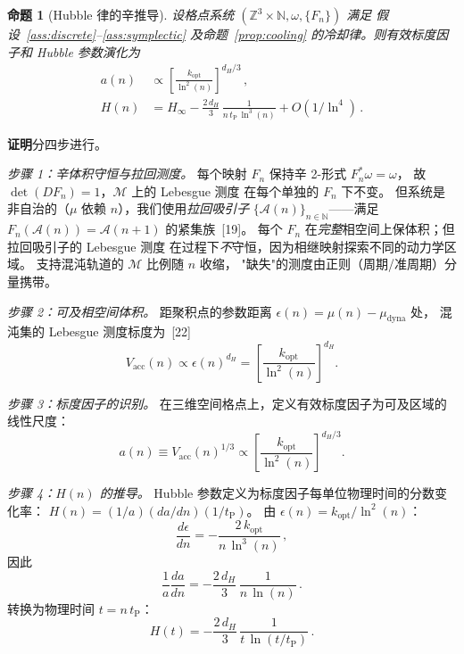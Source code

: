 \documentclass[a4paper,11pt]{article}
\theoremstyle{plain}
\newtheorem{proposition}{命题}
\newcommand{\lnq}{\ln^2}
\newcommand{\tP}{t_{\mathrm{P}}}
\newcommand{\Hinf}{H_{\infty}}
\newcommand{\ZZ}{\mathbb{Z}}
\newcommand{\NN}{\mathbb{N}}
\begin{document}
\begin{proposition}[Hubble 律的辛推导]\label{prop:symplectic_hubble}
设格点系统 $(\ZZ^3\times\NN, \omega, \{F_n\})$ 满足
假设~\ref{ass:discrete}--\ref{ass:symplectic} 及命题~\ref{prop:cooling}
的冷却律。则有效标度因子和 Hubble 参数演化为
\begin{align}
  a(n) &\propto \left[\frac{k_{\mathrm{opt}}}{\lnq(n)}\right]^{d_H/3}\,, \\[4pt]
  H(n) &= \Hinf - \frac{2\,d_H}{3}\,\frac{1}{n\,\tP\,\ln^3(n)}
    + O(1/\ln^4)\,.
\end{align}
\end{proposition}

\textbf{证明}分四步进行。

\emph{步骤 1：辛体积守恒与拉回测度。}
每个映射 $F_n$ 保持辛 2-形式 $F_n^*\omega = \omega$，
故 $\det(DF_n) = 1$，$\mathcal{M}$ 上的 Lebesgue 测度
在每个单独的 $F_n$ 下不变。
但系统是非自治的（$\mu$ 依赖 $n$），我们使用\emph{拉回吸引子}
$\{\mathcal{A}(n)\}_{n\in\NN}$——满足
$F_n(\mathcal{A}(n)) = \mathcal{A}(n+1)$ 的紧集族~[19]。
每个 $F_n$ 在\emph{完整}相空间上保体积；但拉回吸引子的 Lebesgue 测度
在过程下\emph{不}守恒，因为相继映射探索不同的动力学区域。
支持混沌轨道的 $\mathcal{M}$ 比例随 $n$ 收缩，
"缺失"的测度由正则（周期/准周期）分量携带。

\emph{步骤 2：可及相空间体积。}
距聚积点的参数距离 $\epsilon(n) = \mu(n) - \mu_{\mathrm{dyna}}$ 处，
混沌集的 Lebesgue 测度标度为~[22]
\begin{equation}
  V_{\mathrm{acc}}(n) \propto \epsilon(n)^{d_H}
  = \left[\frac{k_{\mathrm{opt}}}{\lnq(n)}\right]^{d_H}.
\end{equation}

\emph{步骤 3：标度因子的识别。}
在三维空间格点上，定义有效标度因子为可及区域的线性尺度：
\begin{equation}
  a(n) \equiv V_{\mathrm{acc}}(n)^{1/3}
  \propto \left[\frac{k_{\mathrm{opt}}}{\lnq(n)}\right]^{d_H/3}.
\end{equation}

\emph{步骤 4：$H(n)$ 的推导。}
Hubble 参数定义为标度因子每单位物理时间的分数变化率：
$H(n) = (1/a)(da/dn)(1/\tP)$。
由 $\epsilon(n) = k_{\mathrm{opt}}/\lnq(n)$：
\begin{equation}
  \frac{d\epsilon}{dn} = -\frac{2\,k_{\mathrm{opt}}}{n\,\ln^3(n)}\,,
\end{equation}
因此
\begin{equation}
  \frac{1}{a}\frac{da}{dn}
  = -\frac{2\,d_H}{3}\,\frac{1}{n\,\ln(n)}\,.
\end{equation}
转换为物理时间 $t = n\,\tP$：
\begin{equation}
  H(t) = -\frac{2\,d_H}{3}\,\frac{1}{t\,\ln(t/\tP)}\,.
\end{equation}
\end{document}
